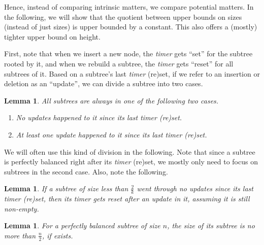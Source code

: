 \documentclass{article}
\newtheorem{lemma}[theorem]{Lemma}
\begin{document}
Hence, instead of comparing intrinsic matters, we compare potential matters. In the following, we will show that the quotient between upper bounds on sizes (instead of just sizes) is upper bounded by a constant. This also offers a (mostly) tighter upper bound on height.

First, note that when we insert a new node, the \emph{timer} gets ``set'' for the subtree rooted by it, and when we rebuild a subtree, the \emph{timer} gets ``reset'' for all subtrees of it. Based on a subtree's last \emph{timer} (re)set, if we refer to an insertion or deletion as an ``update'', we can divide a subtree into two cases.
\begin{lemma}
All subtrees are always in one of the following two cases.
\begin{enumerate}
    \item No updates happened to it since its last timer (re)set.
    \item At least one update happened to it since its last timer (re)set.
\end{enumerate}
\label{lemma:2cases}
\end{lemma}

We will often use this kind of division in the following. Note that since a subtree is perfectly balanced right after its \emph{timer} (re)set, we mostly only need to focus on subtrees in the second case. Also, note the following.

\begin{lemma}
If a subtree of size less than $\frac{2}{k}$ went through no updates since its last timer (re)set, then its timer gets reset after an update in it, assuming it is still non-empty.
\label{lemma:toosmallT}
\end{lemma}

\begin{lemma}
For a perfectly balanced subtree of size $n$, the size of its subtree is no more than $\frac{n}{2}$, if exists.
\label{lemma:perfsize}
\end{lemma}
\end{document}
